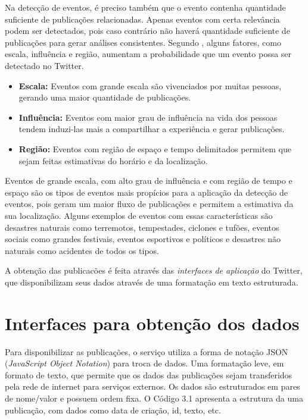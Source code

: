Na detecção de eventos, é preciso também que o evento contenha quantidade suficiente de publicações relacionadas. Apenas eventos com certa relevância podem ser detectados, pois caso contrário não haverá quantidade suficiente de publicações para gerar análises consistentes. Segundo , alguns fatores, como escala, influência e região, aumentam a probabilidade que um evento possa ser detectado no Twitter.

\begin{itemize}
	\item \textbf{Escala:} Eventos com grande escala são vivenciados por muitas pessoas, gerando uma maior quantidade de publicações.
	\item \textbf{Influência:} Eventos com maior grau de influência na vida dos pessoas tendem induzi-las mais a compartilhar a experiência e gerar publicações.
	\item \textbf{Região:} Eventos com região de espaço e tempo delimitados permitem que sejam feitas estimativas do horário e da localização.
\end{itemize}

Eventos de grande escala, com alto grau de influência e com região de tempo e espaço são os tipos de eventos mais propícios para a aplicação da detecção de eventos, pois geram um maior fluxo de publicações e permitem a estimativa da sua localização. Alguns exemplos de eventos com essas características são desastres naturais como terremotos, tempestades, ciclones e tufões, eventos sociais como grandes festivais, eventos esportivos e políticos e desastres não naturais como acidentes de todos os tipos.

A obtenção das publicacões é feita através das \textit{interfaces de aplicação} do Twitter, que disponibilizam seus dados através de uma formatação em texto estruturada.

\section{Interfaces para obtenção dos dados}

Para disponibilizar as publicações, o serviço utiliza a forma de notação JSON (\textit{JavaScript Object Notation}) para troca de dados. Uma formatação leve, em formato de texto, que permite que os dados das publicações sejam transferidos pela rede de internet para serviços externos. Os dados são estruturados em pares de nome/valor e possuem ordem fixa. O Código 3.1 apresenta a estrutura da uma publicação, com dados como data de criação, id, texto, etc.

